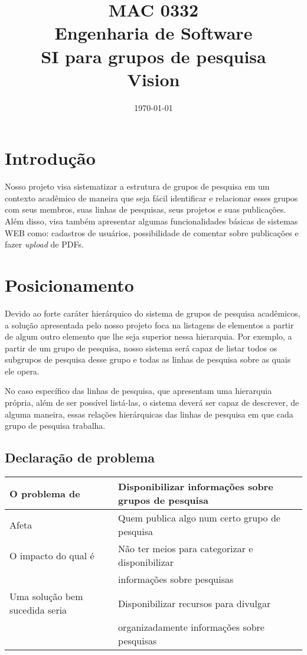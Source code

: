 \documentclass[11pt, a4paper]{article}
\title{MAC 0332\\
	Engenharia de Software\\
	SI para grupos de pesquisa\\
	Vision}
\date{\today}
\begin{document}
	\maketitle
	\newpage
    \section{Introdução}
        Nosso projeto visa sistematizar a estrutura de grupos de pesquisa em um contexto acadêmico
        de maneira que seja fácil identificar e relacionar esses grupos com seus membros, suas
        linhas de pesquisas, seus projetos e suas publicações. Além disso, visa também apresentar
        algumas funcionalidades básicas de sistemas WEB como: cadastros de usuários, possibilidade
        de comentar sobre publicações e fazer \textit{upload} de PDFs.
    
    \section{Posicionamento}
        Devido ao forte caráter hierárquico do sistema de grupos de pesquisa acadêmicos, a solução
        apresentada pelo nosso projeto foca na listagens de elementos a partir de algum outro
        elemento que lhe seja superior nessa hierarquia. Por exemplo, a partir de um grupo de
        pesquisa, nosso sistema será capaz de listar todos os subgrupos de pesquisa desse grupo e
        todas as linhas de pesquisa sobre as quais ele opera.
        
        No caso específico das linhas de pesquisa, que apresentam uma hierarquia própria, além de
        ser possível listá-las, o sistema deverá ser capaz de descrever, de alguma maneira, essas
        relações hierárquicas das linhas de pesquisa em que cada grupo de pesquisa trabalha.
        
        \subsection{Declaração de problema}
            \begin{tabular}{| l | l |}
                \hline                       
                O problema de & Disponibilizar informações sobre grupos de pesquisa \\ \hline
                Afeta & Quem publica algo num certo grupo de pesquisa \\ \hline
                O impacto do qual é & Não ter meios para categorizar e disponibilizar\\ 
                                                 &  informações sobre pesquisas \\ \hline
                Uma solução bem sucedida seria & Disponibilizar recursos para divulgar \\
                                                                    & organizadamente informações sobre pesquisas \\
                \hline  
            \end{tabular}
        
\end{document}
